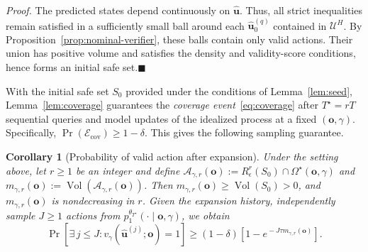 \documentclass[letterpaper, 10 pt, conference]{ieeeconf}
\renewcommand{\o}{\mathbf{o}}
\newtheorem{corollary}{Corollary}
\begin{document}
\emph{Proof.} 
The predicted states depend continuously on $\hat{\mathbf u}$. Thus, all strict inequalities remain satisfied in a sufficiently small ball around each $\hat{\mathbf u}_0^{(q)}$ contained in $\mathcal U^H$. By Proposition~\ref{prop:nominal-verifier}, these balls contain only valid actions. Their union has positive volume and satisfies the density and validity-score conditions, hence forms an initial safe set.\hfill$\blacksquare$

With the initial safe set $S_0$ provided under the conditions of Lemma~\ref{lem:seed}, Lemma~\ref{lem:coverage} guarantees the \emph{coverage event}~\eqref{eq:coverage} after $T^\star\!=\!rT$ sequential queries and model updates of the idealized process at a fixed $(\o,\gamma)$.
Specifically, \(\Pr(\mathcal E_{\mathrm{cov}})\!\ge\!1\!-\!\delta\). This gives the following sampling guarantee.
\begin{corollary}[Probability of valid action after expansion]
\label{thm:safe-action-availability}
Under the setting above, let $r\!\ge\!1$ be an integer and define
$\mathcal A_{\gamma,r}(\o)\!:=\!R_\epsilon^r(S_0)\cap\Omega^\star(\o,\gamma)$
and $m_{\gamma,r}(\o):=\operatorname{Vol}(\mathcal A_{\gamma,r}(\o))$. Then $m_{\gamma,r}(\o)\ge\operatorname{Vol}(S_0)>0$, and $m_{\gamma,r}(\o)$ is nondecreasing in $r$. 
Given the expansion history,
independently sample $J\ge1$ actions from $p_1^{\theta_{T^\star}}(\cdot\mid\o,\gamma)$, we obtain
\begin{equation}
\Pr\!\left[\exists\,\!j\!\le\! J\!:\! v_\gamma(\hat{\mathbf u}^{(j)};\!\o)\!=\!1\right]
\!\ge\!
(1-\delta)\!\left[1\!-\!e^{\!-J\tau m_{\gamma,r}(\o)}\right]\!\!.
\label{eq:main1}
\end{equation}
\end{corollary}
\end{document}
